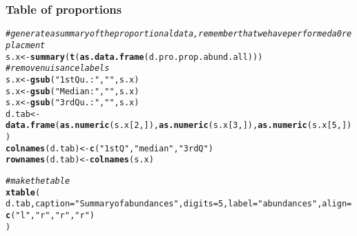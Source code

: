 \documentclass[11pt]{article}\usepackage[]{graphicx}\usepackage[]{color}
\makeatletter
\newcommand{\hlnum}[1]{\textcolor[rgb]{0.686,0.059,0.569}{#1}}%
\newcommand{\hlstr}[1]{\textcolor[rgb]{0.192,0.494,0.8}{#1}}%
\newcommand{\hlcom}[1]{\textcolor[rgb]{0.678,0.584,0.686}{\textit{#1}}}%
\newcommand{\hlstd}[1]{\textcolor[rgb]{0.345,0.345,0.345}{#1}}%
\newcommand{\hlkwb}[1]{\textcolor[rgb]{0.69,0.353,0.396}{#1}}%
\newcommand{\hlkwc}[1]{\textcolor[rgb]{0.333,0.667,0.333}{#1}}%
\newcommand{\hlkwd}[1]{\textcolor[rgb]{0.737,0.353,0.396}{\textbf{#1}}}%
\newenvironment{kframe}{%
 \def\at@end@of@kframe{}%
 \ifinner\ifhmode%
  \def\at@end@of@kframe{\end{minipage}}%
  \begin{minipage}{\columnwidth}%
 \fi\fi%
 \def\FrameCommand##1{\hskip\@totalleftmargin \hskip-\fboxsep
 \colorbox{shadecolor}{##1}\hskip-\fboxsep
     \hskip-\linewidth \hskip-\@totalleftmargin \hskip\columnwidth}%
 \MakeFramed {\advance\hsize-\width
   \@totalleftmargin\z@ \linewidth\hsize
   \@setminipage}}%
 {\par\unskip\endMakeFramed%
 \at@end@of@kframe}
\makeatother
\begin{document}
\subsubsection{Table of proportions}
\begin{kframe}
\begin{alltt}
\hlcom{# generate a summary of the proportional data, remember that we have performed a 0 replacment}
\hlstd{s.x} \hlkwb{<-} \hlkwd{summary}\hlstd{(}\hlkwd{t}\hlstd{(}\hlkwd{as.data.frame}\hlstd{(d.pro.prop.abund.all)))}
\hlcom{# remove nuisance labels}
\hlstd{s.x} \hlkwb{<-} \hlkwd{gsub}\hlstd{(}\hlstr{"1st Qu.:"}\hlstd{,} \hlstr{""}\hlstd{, s.x)}
\hlstd{s.x} \hlkwb{<-} \hlkwd{gsub}\hlstd{(}\hlstr{"Median :"}\hlstd{,} \hlstr{""}\hlstd{, s.x)}
\hlstd{s.x} \hlkwb{<-} \hlkwd{gsub}\hlstd{(}\hlstr{"3rd Qu.:"}\hlstd{,} \hlstr{""}\hlstd{, s.x)}
\hlstd{d.tab} \hlkwb{<-} \hlkwd{data.frame}\hlstd{(} \hlkwd{as.numeric}\hlstd{(s.x[}\hlnum{2}\hlstd{,]),} \hlkwd{as.numeric}\hlstd{(s.x[}\hlnum{3}\hlstd{,]),} \hlkwd{as.numeric}\hlstd{(s.x[}\hlnum{5}\hlstd{,]) )}
\hlkwd{colnames}\hlstd{(d.tab)} \hlkwb{<-} \hlkwd{c}\hlstd{(} \hlstr{"1st Q"}\hlstd{,} \hlstr{"median"}\hlstd{,} \hlstr{"3rd Q"}\hlstd{)}
\hlkwd{rownames}\hlstd{(d.tab)} \hlkwb{<-} \hlkwd{colnames}\hlstd{(s.x)}

\hlcom{# make the table}
\hlkwd{xtable}\hlstd{(}
   \hlstd{d.tab,} \hlkwc{caption}\hlstd{=}\hlstr{"Summary of abundances"}\hlstd{,} \hlkwc{digits}\hlstd{=}\hlnum{5}\hlstd{,} \hlkwc{label}\hlstd{=}\hlstr{"abundances"}\hlstd{,} \hlkwc{align}\hlstd{=}\hlkwd{c}\hlstd{(}\hlstr{"l"}\hlstd{,}\hlstr{"r"}\hlstd{,} \hlstr{"r"}\hlstd{,} \hlstr{"r"}\hlstd{)}
\hlstd{)}
\end{alltt}
\end{kframe}%
\end{document}
